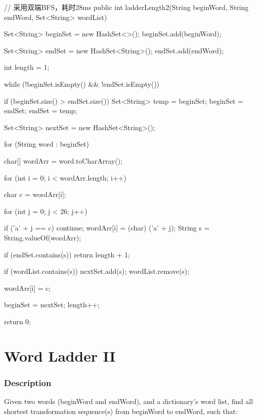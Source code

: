 \begin{Code}
// 采用双端BFS，耗时28ms
public int ladderLength2(String beginWord, String endWord, Set<String> wordList) {
    Set<String> beginSet = new HashSet<>();
    beginSet.add(beginWord);

    Set<String> endSet = new HashSet<String>();
    endSet.add(endWord);

    int length = 1;

    while (!beginSet.isEmpty() && !endSet.isEmpty()) {
        if (beginSet.size() > endSet.size()) {
            Set<String> temp = beginSet;
            beginSet = endSet;
            endSet = temp;
        }

        Set<String> nextSet = new HashSet<String>();

        for (String word : beginSet) {
            char[] wordArr = word.toCharArray();

            for (int i = 0; i < wordArr.length; i++) {
                char c = wordArr[i];

                for (int j = 0; j < 26; j++) {
                    if ('a' + j == c) {
                        continue;
                    }
                    wordArr[i] = (char) ('a' + j);
                    String s = String.valueOf(wordArr);

                    if (endSet.contains(s)) {
                        return length + 1;
                    }

                    if (wordList.contains(s)) {
                        nextSet.add(s);
                        wordList.remove(s);
                    }
                }
                wordArr[i] = c;
            }
        }

        beginSet = nextSet;
        length++;
    }

    return 0;
}
\end{Code}

\newpage

\section{Word Ladder II} %

\subsubsection{Description}
Given two words (beginWord and endWord), and a dictionary's word list, find all shortest transformation sequence(s) from beginWord to endWord, such that:

